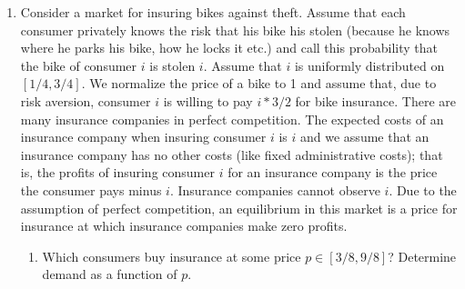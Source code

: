 \documentclass[a4paper,12pt]{article}
\begin{document}
\begin{enumerate}[resume]
\item Consider a market for insuring bikes against theft. Assume that each consumer privately knows the risk that his bike his stolen (because he knows where he parks his bike, how he locks it etc.) and call this probability that the bike of consumer $i$ is stolen $i$. Assume that $i$ is uniformly distributed on $[1/4,3/4]$. We normalize the price of a bike to 1 and assume that, due to risk aversion, consumer $i$ is willing to pay $i*3/2$ for bike insurance. There are many insurance companies in perfect competition. The expected costs of an insurance company when insuring consumer $i$ is $i$ and we assume that an insurance company has no other costs (like fixed administrative costs); that is, the profits of insuring consumer $i$ for an insurance company is the price the consumer pays minus $i$. Insurance companies cannot observe $i$. Due to the assumption of perfect competition, an equilibrium in this market is a price for insurance at which insurance companies make zero profits.
  \begin{enumerate}
  \item Which consumers buy insurance at some price $p\in[3/8,9/8]$? Determine demand as a function of $p$.

\end{enumerate}
\end{enumerate}
\end{document}
